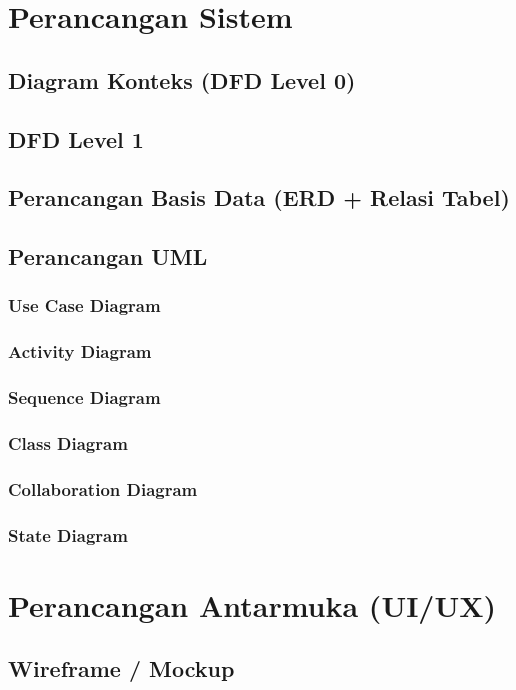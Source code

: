 \documentclass[12pt,a4paper,twoside]{report}
\begin{document}
\section{Perancangan Sistem}

\subsection{Diagram Konteks (DFD Level 0)}
\subsection{DFD Level 1}
\subsection{Perancangan Basis Data (ERD + Relasi Tabel)}

\subsection{Perancangan UML}

\subsubsection{Use Case Diagram}
\subsubsection{Activity Diagram}
\subsubsection{Sequence Diagram}
\subsubsection{Class Diagram}
\subsubsection{Collaboration Diagram}
\subsubsection{State Diagram}

\section{Perancangan Antarmuka (UI/UX)}

\subsection{Wireframe / Mockup}
\end{document}
